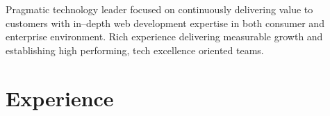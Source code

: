 \documentclass[11pt,a4paper,roman]{moderncv}       %
\begin{document}
\makecvtitle


\small{Pragmatic technology leader focused on continuously delivering value to customers with in--depth web development expertise in both consumer and enterprise environment. Rich experience delivering measurable growth and establishing high performing, tech excellence oriented teams.}



\section{Experience}

\end{document}
